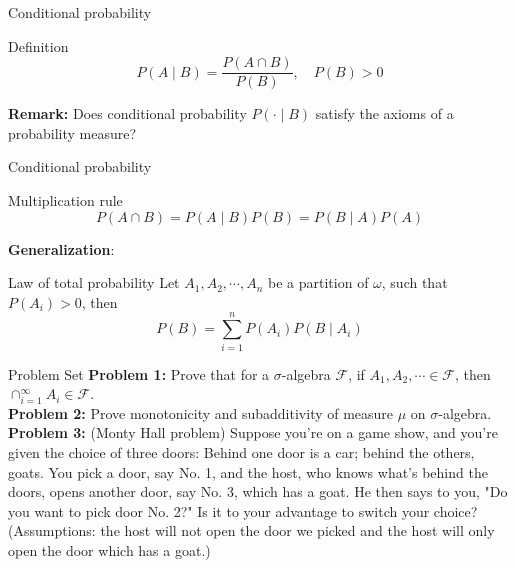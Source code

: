 \documentclass [aspectratio=169]{beamer}
\newcommand{\mc}{\mathcal}
\begin{document}
\begin{frame}{Conditional probability}
    \begin{block}{Definition}
    $$P(A \mid B) = \dfrac{P(A\cap B)}{P(B)}, \quad P(B) > 0$$
    \end{block}
    \vspace{0.1in}
    \textbf{Remark:} Does conditional probability $P(\cdot \mid B)$ satisfy the axioms of a probability measure?
    \vspace{1.5in}
\end{frame}

\begin{frame}{Conditional probability}
\begin{block}{Multiplication rule}
$${P(A\cap B)} = P(A \mid B) P(B) = P(B \mid A) P(A)$$
\end{block}
\vspace{0.1in}
\textbf{Generalization}:
    \begin{block}{Law of total probability}
    Let $A_1, A_2, \cdots, A_n$ be a partition of $\omega$, such that $P(A_i) > 0$, then
    $$P(B) = \sum_{i = 1}^n P(A_i)P(B \mid A_i)$$
    \end{block}
    \vspace{1in}
\end{frame}

\begin{frame}{Problem Set}
    \textbf{Problem 1:} Prove that for a $\sigma$-algebra $\mc{F}$, if $A_1, A_2, \cdots \in \mc{F}$, then $\cap_{i = 1}^\infty A_i \in \mc{F}$.\\
    \vspace{0.1in}
    \textbf{Problem 2:} Prove monotonicity and subadditivity of measure $\mu$ on $\sigma$-algebra. \\
    \vspace{0.1in}
    \textbf{Problem 3:} (Monty Hall problem) Suppose you're on a game show, and you're given the choice of three doors: Behind one door is a car; behind the others, goats. You pick a door, say No. 1, and the host, who knows what's behind the doors, opens another door, say No. 3, which has a goat. He then says to you, "Do you want to pick door No. 2?" Is it to your advantage to switch your choice?\\
    (Assumptions: the host will not open the door we picked and the host will only open the door which has a goat.)

\end{frame}
\end{document}
